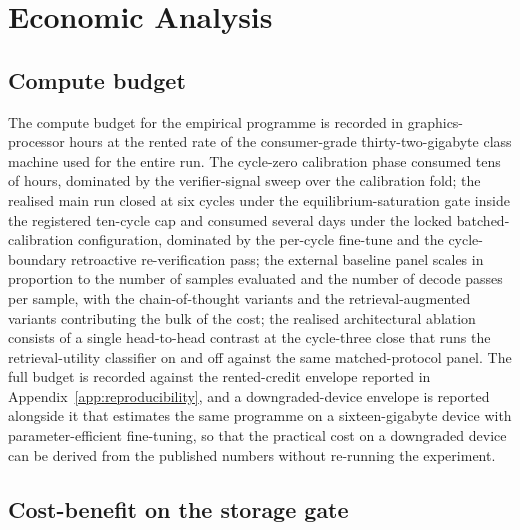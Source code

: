\section{Economic Analysis}
\label{sec:economic}

\subsection{Compute budget}
\label{sec:econ-budget}

The compute budget for the empirical programme is recorded in graphics-processor hours at the rented rate of the consumer-grade thirty-two-gigabyte class machine used for the entire run. The cycle-zero calibration phase consumed tens of hours, dominated by the verifier-signal sweep over the calibration fold; the realised main run closed at six cycles under the equilibrium-saturation gate inside the registered ten-cycle cap and consumed several days under the locked batched-calibration configuration, dominated by the per-cycle fine-tune and the cycle-boundary retroactive re-verification pass; the external baseline panel scales in proportion to the number of samples evaluated and the number of decode passes per sample, with the chain-of-thought variants and the retrieval-augmented variants contributing the bulk of the cost; the realised architectural ablation consists of a single head-to-head contrast at the cycle-three close that runs the retrieval-utility classifier on and off against the same matched-protocol panel. The full budget is recorded against the rented-credit envelope reported in Appendix~\ref{app:reproducibility}, and a downgraded-device envelope is reported alongside it that estimates the same programme on a sixteen-gigabyte device with parameter-efficient fine-tuning, so that the practical cost on a downgraded device can be derived from the published numbers without re-running the experiment.

\subsection{Cost-benefit on the storage gate}
\label{sec:econ-cost-benefit}

